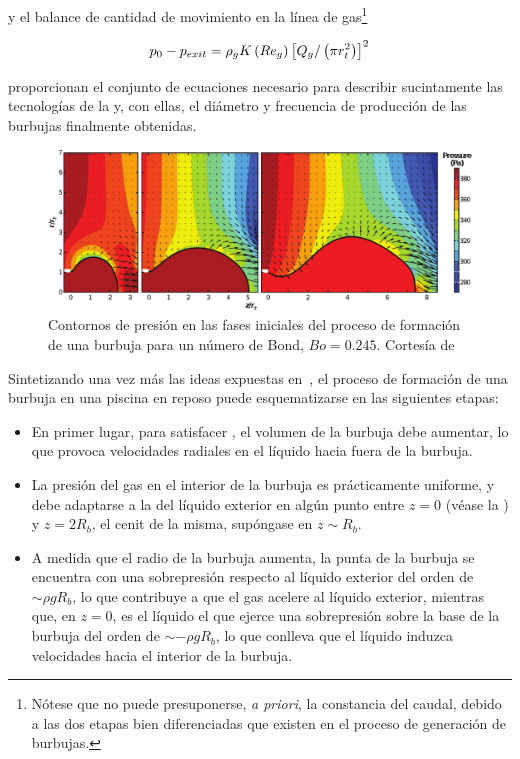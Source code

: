 y el balance de cantidad de movimiento en la línea de gas\footnote{Nótese que no puede presuponerse, \textit{a priori}, la constancia del caudal, debido a las dos etapas bien diferenciadas que existen en el proceso de generación de burbujas.}

\begin{equation}\LABEQ{continuidad}
p_{0} - p_{exit} = \rho_{g}K\left(Re_{g}\right)\left[Q_{g}/\left(\pi r_{t}^{2}\right)\right]^{2}
\end{equation}

proporcionan el conjunto de ecuaciones necesario para describir sucintamente las tecnologías de la  y, con ellas, el diámetro y frecuencia de producción de las burbujas finalmente obtenidas. 
\begin{figure}[hbtp!]
\includegraphics[width=\linewidth]{introduccion/figuras/esquemaBurbuja.eps}
\caption{Contornos de presión en las fases iniciales del proceso de formación de una burbuja para un número de Bond, $Bo = 0.245$. Cortesía de~\cite{Rodriguez-Rodriguez2015b}}
\end{figure}

Sintetizando una vez más las ideas expuestas en~\cite{Rodriguez-Rodriguez2015b}, el proceso de formación de una burbuja en una piscina en reposo puede esquematizarse en las siguientes etapas:

\begin{itemize}
\item En primer lugar, para satisfacer , el volumen de la burbuja debe aumentar, lo que provoca velocidades radiales en el líquido hacia fuera de la burbuja. 
\item La presión del gas en el interior de la burbuja es prácticamente uniforme, y debe adaptarse a la del líquido exterior en algún punto entre $z = 0$ (véase la ) y $z = 2R_{b}$, el cenit de la misma, supóngase en $z \sim R_{b}$. 
\item A medida que el radio de la burbuja aumenta, la punta de la burbuja se encuentra con una sobrepresión respecto al líquido exterior del orden de $\sim \rho g R_{b}$, lo que contribuye a que el gas acelere al líquido exterior, mientras que, en $z = 0$, es el líquido el que ejerce una sobrepresión sobre la base de la burbuja del orden de $\sim -\rho g R_{b}$, lo que conlleva que el líquido induzca velocidades hacia el interior de la burbuja. 
\end{itemize}

